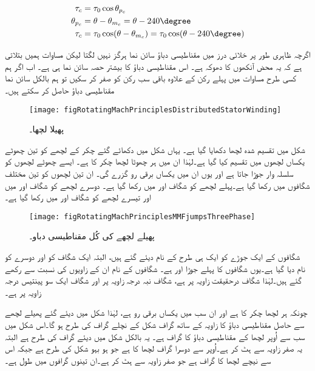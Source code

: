 %
\begin{gather}
\begin{aligned}
\tau_c&=\tau_0 \cos \theta_{p_c}\\
\theta_{p_c}&=\theta-\theta_{m_c}=\theta-240\degree\\
\tau_c&=\tau_0 \cos (\theta-\theta_{m_c})=\tau_0 \cos (\theta-240\degree)
\end{aligned}
\end{gather}

اگرچہ ظاہری طور پر خلائی درز میں مقناطیسی دباؤ سائن نما ہرگز نہیں لگتا لیکن مساوات  ہمیں بتلاتی ہے کہ یہ محض آنکھوں کا دھوکہ ہے۔ اس مقناطیسی دباؤ کا بیشتر حصہ سائن نما ہی ہے۔  اب اگر ہم کسی طرح مساوات   میں پہلے رکن کے علاوہ باقی سب رکن کو صفر کر سکیں تو ہم بالکل  سائن نما مقناطیسی دباؤ حاصل کر سکتے ہیں۔
\begin{figure}
\centering
\texttt{[image: figRotatingMachPrinciplesDistributedStatorWinding]}
\caption{پھیلا لچھا۔}
\label{شکل_گھومتے_مشین_پھیلا_لچھا}
\end{figure}

شکل   میں تقسیم شدہ لچھا دکھایا گیا ہے۔ یہاں شکل   میں دکھائے گئے  چکر کے لچھے کو تین چھوٹے یکساں لچھوں میں تقسیم کیا گیا ہے۔لہٰذا ان میں ہر چھوٹا لچھا  چکر کا ہے۔  ایسے چھوٹے لچھوں کو سلسلہ وار جوڑا جاتا ہے اور  یوں ان میں یکساں  برقی رو  گزرے گی۔ ان تین لچھوں کو تین مختلف شگافوں میں رکھا گیا ہے۔پہلے لچھے کو شگاف  اور  میں رکھا گیا ہے۔ دوسرے لچھے کو شگاف  اور  میں اور تیسرے لچھے کو شگاف  اور  میں رکھا گیا ہے۔
\begin{figure}
\centering
\texttt{[image: figRotatingMachPrinciplesMMFjumpsThreePhase]}
\caption{پھیلے لچھے کی کُل مقناطیسی دباو۔}
\label{شکل_گھومتے_مشین_پھیلے_لچھے_کی_دباو}
\end{figure}


شگافوں کے ایک جوڑے کو ایک ہی طرح کے نام دیئے گئے ہیں، البتہ ایک شگاف کو  اور دوسرے کو  نام دیا گیا ہے۔یوں شگافوں کا پہلے جوڑا   اور   ہے۔   شگافوں کے نام ان کے زاویوں کی نسبت سے رکھے گئے ہیں۔لہٰذا شگاف   درحقیقت  زاویہ پر ہے، شگاف  نبہ درجہ زاویہ پر اور شگاف   ایک سو پینتیس درجہ زاویہ پر ہے۔

چونکہ ہر لچھا  چکر کا ہے اور ان سب میں یکساں برقی رو  ہے،  لہٰذا  شکل    میں دیئے گئے پھیلے لچھے سے حاصل مقناطیسی دباؤ کا زاویہ کے ساتھ گراف شکل   کے نچلے گراف کی طرح ہو گا۔اس شکل میں سب سے اُوپر لچھا    کے مقناطیسی دباؤ کا گراف ہے۔ یہ بالکل شکل   میں دیئے گراف کی طرح ہے البتہ یہ صفر زاویہ سے  ہٹ کر ہے۔اُوپر سے دوسرا گراف لچھا  کا ہے جو ہو بہو شکل  کی طرح ہے جبکہ اس سے نیچے لچھا  کا گراف ہے جو صفر زاویہ سے  ہٹ کر ہے۔ان تینوں گرافوں میں طول  ہے۔

